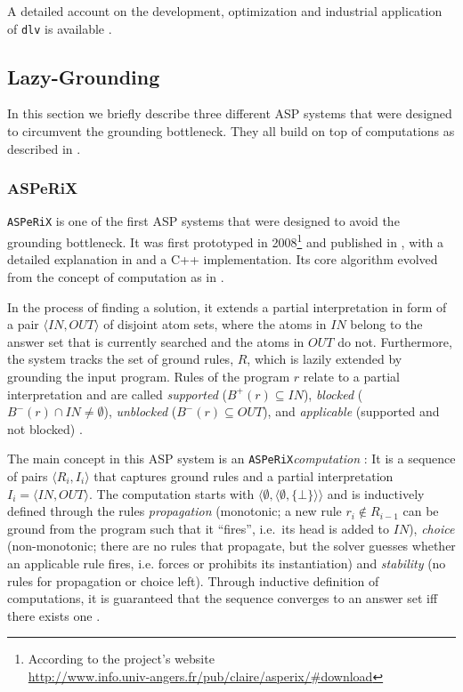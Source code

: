 \documentclass[final]{vutinfth} %
\newcommand{\bodyf}{B}
\newcommand{\asperix}{\texttt{ASPeRiX}\xspace}
\newcommand{\dlv}{\texttt{dlv}\xspace}
\begin{document}
A detailed account on the development, optimization and industrial application of \dlv is available \cite{dlvproject}.

\subsection{Lazy-Grounding}

In this section we briefly describe three different ASP systems that were designed to circumvent the grounding bottleneck. They all build on top of computations as described in \cite{computations}.

\subsubsection{ASPeRiX}
\label{sec:asperix}

\asperix is one of the first ASP systems that were designed to avoid the grounding bottleneck. It was first prototyped in 2008\footnote{According to the project's website\\ \url{http://www.info.univ-angers.fr/pub/claire/asperix/\#download}} and published in \cite{asperixfirst,fofchain}, with a detailed explanation in \cite{asperix} and a C++ implementation. Its core algorithm evolved from the concept of computation as in \cite{computations}.

In the process of finding a solution, it extends a partial interpretation \cite[Def.~4]{asperix} in form of a pair $\langle IN, OUT \rangle$ of disjoint atom sets, where the atoms in $IN$ belong to the answer set that is currently searched and the atoms in $OUT$ do not. Furthermore, the system tracks the set of ground rules, $R$, which is lazily extended by grounding the input program. Rules of the program $r$ relate to a partial interpretation and are called \emph{supported} ($\bodyf^+(r) \subseteq IN$), \emph{blocked} ($\bodyf^-(r) \cap IN \not = \emptyset$), \emph{unblocked} ($\bodyf^-(r) \subseteq OUT$), and \emph{applicable} (supported and not blocked) \cite[Def.~5]{asperix}. 

The main concept in this ASP system is an \asperix \emph{computation} \cite[Def.~7]{asperix}: It is a sequence of pairs $\langle R_i, I_i \rangle$ that captures ground rules and a partial interpretation $I_i = \langle IN, OUT \rangle$. The computation starts with $\langle \emptyset, \langle \emptyset, \{ \bot \} \rangle \rangle$ and is inductively defined through the rules \emph{propagation} (monotonic; a new rule $r_i \not \in R_{i-1}$ can be ground from the program such that it \enquote{fires}, i.e.~its head is added to $IN$), \emph{choice} (non-monotonic; there are no rules that propagate, but the solver guesses whether an applicable rule fires, i.e. forces or prohibits its instantiation) and \emph{stability} (no rules for propagation or choice left). Through inductive definition of computations, it is guaranteed that the sequence converges to an answer set iff there exists one \cite[Thm.~2]{asperix}.
\end{document}
